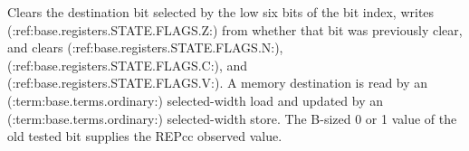 Clears the destination bit selected by the low six bits of the bit index, writes (:ref:base.registers.STATE.FLAGS.Z:) from whether that bit was previously clear, and clears (:ref:base.registers.STATE.FLAGS.N:), (:ref:base.registers.STATE.FLAGS.C:), and (:ref:base.registers.STATE.FLAGS.V:). A memory destination is read by an (:term:base.terms.ordinary:) selected-width load and updated by an (:term:base.terms.ordinary:) selected-width store. The B-sized 0 or 1 value of the old tested bit supplies the REPcc observed value.
